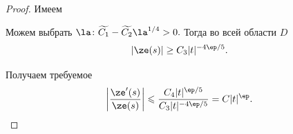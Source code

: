 \begin{proof}
  Имеем

  Можем выбрать $\la\colon\widetilde{C_1}-\widetilde{C_2}\la^{1/4}>0.$ Тогда во всей области $D$
  $$
    |\ze(s)|\ge C_3|t|^{-4\ep/5}.
  $$

  Получаем требуемое $$\left|\frac{\ze'(s)}{\ze(s)}\right|\leqslant\frac{C_4|t|^{\ep/5}}{C_3|t|^{-4\ep/5}}=C|t|^\ep.$$
\end{proof} 
